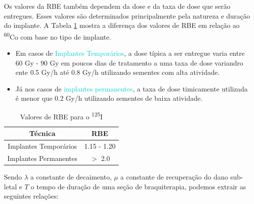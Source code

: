\documentclass[11pt,a4paper]{article}
\begin{document}
			Os valores da RBE também dependem da dose e da taxa de dose que serão entregues. Esses valores são determinados principalmente pela natureza e duração do implante. A Tabela \ref{tb:rbeI25} mostra a diferença dos valores de RBE em relação ao \textsuperscript{60}Co com base no tipo de implante.

				\begin{itemize}
					\item Em casos de \textcolor{DarkTurquoise}{Implantes Temporários}, a dose típica a ser entregue varia entre 60 Gy - 90 Gy em poucos dias de tratamento a uma taxa de dose variandro ente 0.5 Gy/h até 0.8 Gy/h utilizando sementes com alta atividade.
					\item Já nos casos de \textcolor{DarkTurquoise}{implantes permanentes}, a taxa de dose timicamente utilizada é menor que 0.2 Gy/h utilizando sementes de baixa atividade.
				\end{itemize}

				\begin{table}[h]
					\centering
					\caption{Valores de RBE para o \textsuperscript{125}I}
					\label{tb:rbeI25}
					\begin{tabular}{c c}
					\toprule
					Técnica & RBE \\
					\midrule[1.5pt]
					Implantes Temporários & 1.15 - 1.20 \\
					Implantes Permanentes & $>$ 2.0 \\
					\bottomrule
					\bottomrule
					\end{tabular}
				\end{table}

			Sendo $\lambda$ a constante de decaimento, $\mu$ a constante de recuperação do dano sub-letal e $T$ o tempo de duração de uma seção de braquiterapia, podemos extrair as seguintes relações:
			
\end{document}
